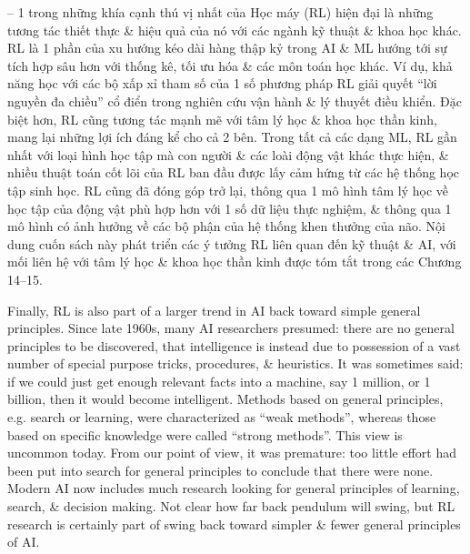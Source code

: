 \documentclass{article}
\begin{document}
\begin{itemize}
\begin{itemize}
        -- 1 trong những khía cạnh thú vị nhất của Học máy (RL) hiện đại là những tương tác thiết thực \& hiệu quả của nó với các ngành kỹ thuật \& khoa học khác. RL là 1 phần của xu hướng kéo dài hàng thập kỷ trong AI \& ML hướng tới sự tích hợp sâu hơn với thống kê, tối ưu hóa \& các môn toán học khác. Ví dụ, khả năng học với các bộ xấp xỉ tham số của 1 số phương pháp RL giải quyết ``lời nguyền đa chiều'' cổ điển trong nghiên cứu vận hành \& lý thuyết điều khiển. Đặc biệt hơn, RL cũng tương tác mạnh mẽ với tâm lý học \& khoa học thần kinh, mang lại những lợi ích đáng kể cho cả 2 bên. Trong tất cả các dạng ML, RL gần nhất với loại hình học tập mà con người \& các loài động vật khác thực hiện, \& nhiều thuật toán cốt lõi của RL ban đầu được lấy cảm hứng từ các hệ thống học tập sinh học. RL cũng đã đóng góp trở lại, thông qua 1 mô hình tâm lý học về học tập của động vật phù hợp hơn với 1 số dữ liệu thực nghiệm, \& thông qua 1 mô hình có ảnh hưởng về các bộ phận của hệ thống khen thưởng của não. Nội dung cuốn sách này phát triển các ý tưởng RL liên quan đến kỹ thuật \& AI, với mối liên hệ với tâm lý học \& khoa học thần kinh được tóm tắt trong các Chương 14--15.

        Finally, RL is also part of a larger trend in AI back toward simple general principles. Since late 1960s, many AI researchers presumed: there are no general principles to be discovered, that intelligence is instead due to possession of a vast number of special purpose tricks, procedures, \& heuristics. It was sometimes said: if we could just get enough relevant facts into a machine, say 1 million, or 1 billion, then it would become intelligent. Methods based on general principles, e.g. search or learning, were characterized as ``weak methods'', whereas those based on specific knowledge were called ``strong methods''. This view is uncommon today. From our point of view, it was premature: too little effort had been put into search for general principles to conclude that there were none. Modern AI now includes much research looking for general principles of learning, search, \& decision making. Not clear how far back pendulum will swing, but RL research is certainly part of swing back toward simpler \& fewer general principles of AI.


\end{itemize}
\end{itemize}
\end{document}
